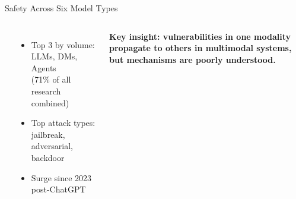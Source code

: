 \begin{frame}{Safety Across Six Model Types}
\begin{columns}[T]
    {\small\bfseries{}}
    \begin{itemize}\scriptsize\setlength\itemsep{2pt}
      \item Top 3 by volume: LLMs, DMs, Agents\\
        (71\% of all research combined)
      \item Top attack types: jailbreak, adversarial, backdoor
      \item Surge since 2023 post-ChatGPT
    \end{itemize}

    \vspace{0.3em}
    {\scriptsize\bfseries Key insight: vulnerabilities in one modality
      propagate to others in multimodal systems, but mechanisms
      are \textbf{poorly understood}.}
  \end{columns}
\end{frame}


